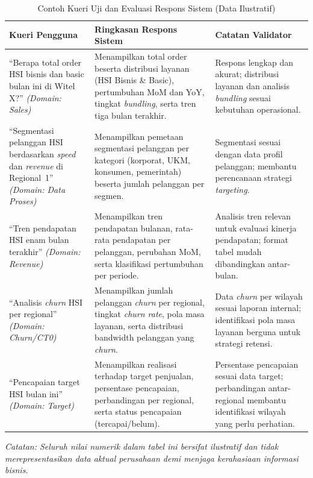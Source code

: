 \begin{table}[htbp]
\centering
\caption{Contoh Kueri Uji dan Evaluasi Respons Sistem (Data Ilustratif)}
\label{tab:contoh-kueri}
\begin{tabular}{|p{4cm}|p{5.5cm}|p{3.5cm}|}
\hline
\textbf{Kueri Pengguna} & \textbf{Ringkasan Respons Sistem} & \textbf{Catatan Validator} \\
\hline
``Berapa total order HSI bisnis dan basic bulan ini di Witel X?'' \newline \textit{(Domain: Sales)} & Menampilkan total order beserta distribusi layanan (HSI Bisnis \& Basic), pertumbuhan MoM dan YoY, tingkat \textit{bundling}, serta tren tiga bulan terakhir. & Res\-pons leng\-kap dan aku\-rat; dis\-tri\-bu\-si la\-ya\-nan dan ana\-li\-sis \textit{bundling} se\-suai ke\-bu\-tuh\-an ope\-ra\-sio\-nal. \\
\hline
``Segmentasi pelanggan HSI berdasarkan \textit{speed} dan \textit{revenue} di Regional~1'' \newline \textit{(Domain: Data Proses)} & Menampilkan pemetaan segmentasi pelanggan per kategori (korporat, UKM, konsumen, pemerintah) beserta jumlah pelanggan per segmen. & Seg\-men\-ta\-si se\-suai de\-ngan da\-ta pro\-fil pe\-lang\-gan; mem\-ban\-tu pe\-ren\-ca\-na\-an stra\-te\-gi \textit{targeting}. \\
\hline
``Tren pendapatan HSI enam bulan terakhir'' \newline \textit{(Domain: Revenue)} & Menampilkan tren pendapatan bulanan, rata-rata pendapatan per pelanggan, perubahan MoM, serta klasifikasi pertumbuhan per periode. & Ana\-li\-sis tren re\-le\-van un\-tuk eva\-lua\-si ki\-ner\-ja pen\-da\-pat\-an; for\-mat ta\-bel mu\-dah di\-ban\-ding\-kan an\-tar-bu\-lan. \\
\hline
``Analisis \textit{churn} HSI per regional'' \newline \textit{(Domain: Churn/CT0)} & Menampilkan jumlah pelanggan \textit{churn} per regional, tingkat \textit{churn rate}, pola masa layanan, serta distribusi bandwidth pelanggan yang \textit{churn}. & Da\-ta \textit{churn} per wi\-la\-yah se\-suai la\-po\-ran in\-ter\-nal; iden\-ti\-fi\-ka\-si po\-la ma\-sa la\-ya\-nan ber\-gu\-na un\-tuk stra\-te\-gi re\-ten\-si. \\
\hline
``Pencapaian target HSI bulan ini'' \newline \textit{(Domain: Target)} & Menampilkan realisasi terhadap target penjualan, persentase pencapaian, perbandingan per regional, serta status pencapaian (tercapai/belum). & Per\-sen\-ta\-se pen\-ca\-pai\-an se\-suai da\-ta tar\-get; per\-ban\-ding\-an an\-tar-re\-gio\-nal mem\-ban\-tu iden\-ti\-fi\-ka\-si wi\-la\-yah yang per\-lu per\-ha\-ti\-an. \\
\hline
\end{tabular}
\begin{flushleft}
\footnotesize\textit{Catatan: Seluruh nilai numerik dalam tabel ini bersifat ilustratif dan tidak merepresentasikan data aktual perusahaan demi menjaga kerahasiaan informasi bisnis.}
\end{flushleft}
\end{table}

